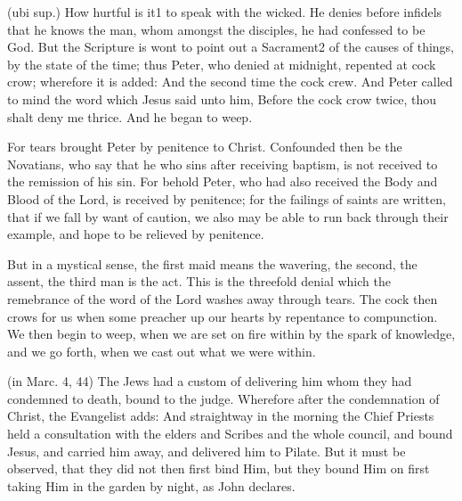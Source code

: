  (ubi sup.) How hurtful is it1 to speak with the wicked. He denies before infidels that he knows the man, whom amongst the disciples, he had confessed to be God. But the Scripture is wont to point out a Sacrament2 of the causes of things, by the state of the time; thus Peter, who denied at midnight, repented at cock crow; wherefore it is added: And the second time the cock crew. And Peter called to mind the word which Jesus said unto him, Before the cock crow twice, thou shalt deny me thrice. And he began to weep.

 For tears brought Peter by penitence to Christ. Confounded then be the Novatians, who say that he who sins after receiving baptism, is not received to the remission of his sin. For behold Peter, who had also received the Body and Blood of the Lord, is received by penitence; for the failings of saints are written, that if we fall by want of caution, we also may be able to run back through their example, and hope to be relieved by penitence.

 But in a mystical sense, the first maid means the wavering, the second, the assent, the third man is the act. This is the threefold denial which the remebrance of the word of the Lord washes away through tears. The cock then crows for us when some preacher up our hearts by repentance to compunction. We then begin to weep, when we are set on fire within by the spark of knowledge, and we go forth, when we cast out what we were within.


 

 (in Marc. 4, 44) The Jews had a custom of delivering him whom they had condemned to death, bound to the judge. Wherefore after the condemnation of Christ, the Evangelist adds: And straightway in the morning the Chief Priests held a consultation with the elders and Scribes and the whole council, and bound Jesus, and carried him away, and delivered him to Pilate. But it must be observed, that they did not then first bind Him, but they bound Him on first taking Him in the garden by night, as John declares.

